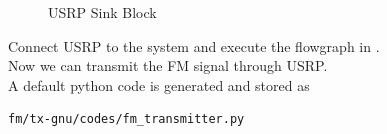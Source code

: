 \begin{enumerate}[label=\arabic*.,ref=\thesection.\theenumi]
\begin{figure}[H]
\caption{USRP Sink Block}
\label{fig:usrp sink block}
\end{figure}
Connect USRP to the system and execute the flowgraph in .\\
Now we can transmit the FM signal through USRP.\\
A default python code is generated and stored as
\begin{lstlisting}
fm/tx-gnu/codes/fm_transmitter.py
\end{lstlisting}
\end{enumerate}